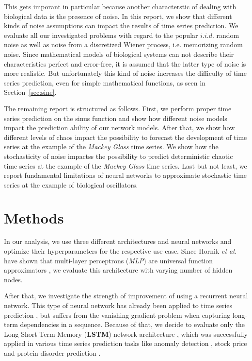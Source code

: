 \documentclass{article}
\begin{document}
This gets imporant in particular because another characterstic of dealing with
biological data is the presence of noise. In
this report, we show that different kinds of noise assumptions can impact the
results of time series prediction. We evaluate all our investigated problems
with regard to the popular $i.i.d.$ random noise as well as noise from a
discretized Wiener process, i.e. memorizing random
noise. Since mathematical models of biological systems can not describe their
characteristics perfect and error-free, it is assumed that the latter type of
noise is more realistic. But unfortunately this kind of noise increases the
difficulty of time series prediction, even for simple mathematical functions,
as seen in Section~\ref{sec:sine}.

The remaining report is structured as follows. First, we perform proper time
series prediction on the sinus function and show how different noise models
impact the prediction ability of our network models. After that, we show how
different levels of chaos impact the possibility to forecast the development
of time series at the example of the \emph{Mackey Glass} time series. We show
how the stochasticity of noise impactss the possibility to predict deterministic
chaotic time series at the example of the \emph{Mackey Glass} time series. Last
but not least, we report fundamental limitations of neural networks to
approximate stochastic time series at the example of biological oscillators.

\section{Methods}

In our analysis, we use three different architectures and neural networks and
optimize their hyperparameters for the respective use case. Since Hornik
\textit{et al.} have shown that multi-layer perceptrons (\emph{MLP})
are universal
function approximators \cite{hornik1989}, we evaluate this architecture with
varying number of hidden nodes.

After that, we investigate the strength of
improvement of using a recurrent neural network. This type of neural network has
already been applied to time series prediction \cite{connor1994}, but suffers
from the vanishing gradient problem when capturing long-term dependencies in a
sequence. Because of that, we decide to evaluate only the Long Short-Term Memory
(\textbf{LSTM})
network architecture \cite{hochreiter1997}, which was successfully applied in
various time series prediction tasks like anomaly detection \cite{malhotra2015},
stock price \cite{fischer2018} and protein disorder prediction
\cite{hanson2016}.
\end{document}
